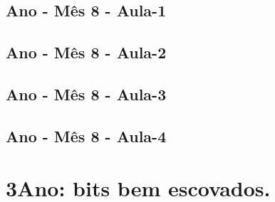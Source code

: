 \begin{multicols}{2}
\section[\sffamily 2\textordmasculine\space Ano - M\^{e}s 8 - Aula-1]{\textordmasculine\space Ano - M\^{e}s 8 - Aula-1}


\section[\sffamily 2\textordmasculine\space Ano - M\^{e}s 8 - Aula-2]{\textordmasculine\space Ano - M\^{e}s 8 - Aula-2}


\section[\sffamily 2\textordmasculine\space Ano - M\^{e}s 8 - Aula-3]{\textordmasculine\space Ano - M\^{e}s 8 - Aula-3}


\section[\sffamily 2\textordmasculine\space Ano - M\^{e}s 8 - Aula-4]{\textordmasculine\space Ano - M\^{e}s 8 - Aula-4}


\end{multicols}
\chapter[ 3\textordmasculine\space Ano: bits bem escovados.]{3\textordmasculine\space Ano: bits bem escovados.}



\pagebreak

